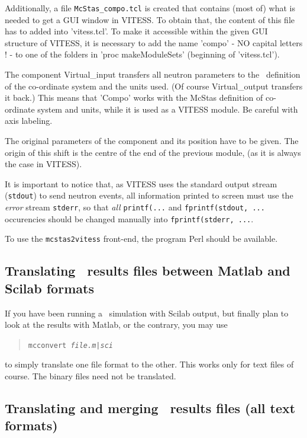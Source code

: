 Additionally, a file \verb'McStas_compo.tcl' is created that contains (most of) what is needed to get a GUI window in VITESS. To obtain that, the content of this file has to added into 'vitess.tcl'. To make it accessible within the given GUI structure of VITESS, it is necessary to add the name 'compo' - NO capital letters ! - to one of the folders in 'proc makeModuleSets{}' (beginning of 'vitess.tcl').

The component Virtual\_input transfers all neutron parameters to the \MCS\ definition of the co-ordinate system and the units used. (Of course Virtual\_output transfers it back.) This means that 'Compo' works with the McStas definition of co-ordinate system and units, while it is used as a VITESS module. Be careful with axis labeling.

The original parameters of the component and its position have to be given. The origin of this shift is the centre of the end of the previous module, (as it is always the case in VITESS).

It is important to notice that, as VITESS uses the standard output stream (\verb+stdout+) to send neutron events, all information printed to screen must use the \emph{error} stream \verb+stderr+, so that \emph{all} \verb+printf(...+ and \verb+fprintf(stdout, ...+ occurencies should be changed manually into \verb+fprintf(stderr, ...+.

To use the \verb+mcstas2vitess+ front-end, the program Perl should be available.

\subsection{Translating \MCS\ results files between Matlab and Scilab formats}
\label{s:mcconvert}
 

If you have been running a \MCS\ simulation with Scilab output, but finally plan to look at the results with Matlab, or the contrary, you may use
\begin{quote}
  \texttt{mcconvert {\it file.{m|sci}\/}}
\end{quote}
to simply translate one file format to the other. This works only for text files of course. The binary files need not be translated.

\subsection{Translating and merging \MCS\ results files (all text formats)}
\label{s:mcformat}
    

